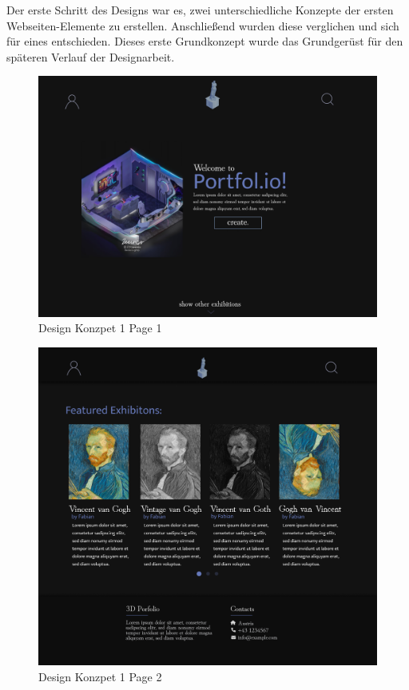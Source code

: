 Der erste Schritt des Designs war es, zwei unterschiedliche Konzepte der ersten Webseiten-Elemente zu erstellen. Anschließend wurden diese verglichen und sich für eines entschieden. Dieses erste Grundkonzept wurde das Grundgerüst für den späteren Verlauf der Designarbeit.

\begin{figure} 
    \centering
    \includegraphics[scale=0.3]{pics/DesignKonzept1_1.png}
    \caption{Design Konzpet 1 Page 1}
\end{figure}

\begin{figure} 
    \centering
    \includegraphics[scale=0.3]{pics/DesignKonzept1_2.png}
    \caption{Design Konzpet 1 Page 2}
\end{figure}

